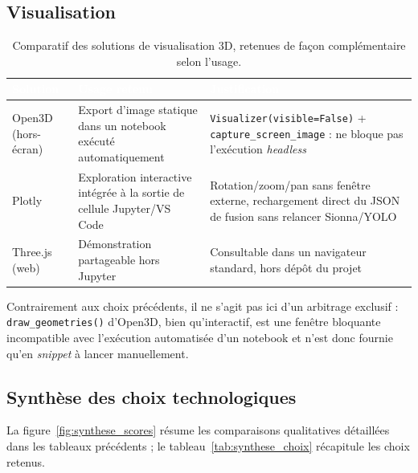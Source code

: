 \documentclass[12pt,a4paper,titlepage]{article}
\newcommand{\hd}[1]{\textcolor{white}{\textbf{#1}}}
\begin{document}
\subsection{Visualisation}

\begin{table}[H]
    \centering
    \caption{Comparatif des solutions de visualisation 3D, retenues de façon complémentaire selon l'usage.}
    \begin{tabularx}{\textwidth}{F{3cm}LL}
        \toprule
        \hd{Solution} & \hd{Usage retenu} & \hd{Justification} \\
        \midrule
        Open3D~\cite{open3d} (hors-écran) & Export d'image statique dans un notebook exécuté automatiquement & \texttt{Visualizer(visible=False)} + \texttt{capture\_screen\_image} : ne bloque pas l'exécution \textit{headless} \\
        Plotly & Exploration interactive intégrée à la sortie de cellule Jupyter/VS Code & Rotation/zoom/pan sans fenêtre externe, rechargement direct du JSON de fusion sans relancer Sionna/YOLO \\
        Three.js (web) & Démonstration partageable hors Jupyter & Consultable dans un navigateur standard, hors dépôt du projet \\
        \bottomrule
    \end{tabularx}
\end{table}

Contrairement aux choix précédents, il ne s'agit pas ici d'un arbitrage exclusif : \texttt{draw\_geometries()} d'Open3D, bien qu'interactif, est une fenêtre bloquante incompatible avec l'exécution automatisée d'un notebook et n'est donc fournie qu'en \textit{snippet} à lancer manuellement.

\subsection{Synthèse des choix technologiques}
\label{subsec:synthese_choix}

La figure~\ref{fig:synthese_scores} résume les comparaisons qualitatives détaillées dans les tableaux précédents ; le tableau~\ref{tab:synthese_choix} récapitule les choix retenus.
\end{document}
